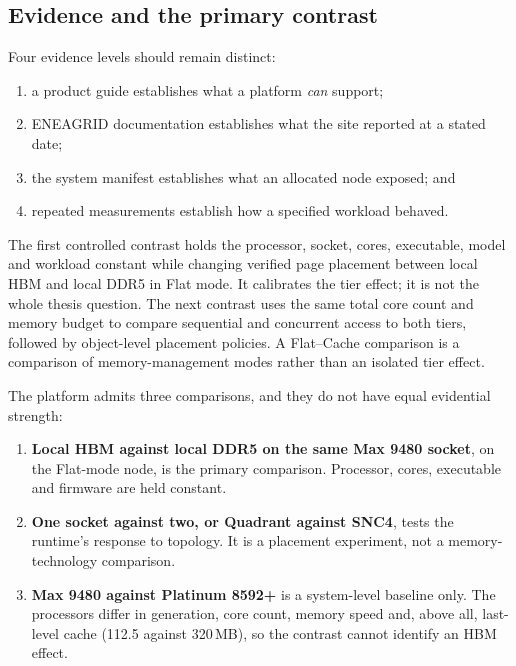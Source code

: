 \subsection{Evidence and the primary contrast}

Four evidence levels should remain distinct:

\begin{enumerate}
  \item a product guide establishes what a platform \emph{can} support;
  \item ENEAGRID documentation establishes what the site reported at a
        stated date;
  \item the system manifest establishes what an allocated node exposed;
        and
  \item repeated measurements establish how a specified workload
        behaved.
\end{enumerate}

The first controlled contrast holds the processor, socket, cores,
executable, model and workload constant while changing verified page
placement between local HBM and local DDR5 in Flat mode.  It calibrates
the tier effect; it is not the whole thesis question.  The next contrast
uses the same total core count and memory budget to compare sequential
and concurrent access to both tiers, followed by object-level placement
policies.  A Flat--Cache comparison is a comparison of
memory-management modes rather than an isolated tier effect.

The platform admits three comparisons, and they do not have equal
evidential strength:

\begin{enumerate}
  \item \textbf{Local HBM against local DDR5 on the same Max 9480
        socket}, on the Flat-mode node, is the primary comparison.
        Processor, cores, executable and firmware are held constant.
  \item \textbf{One socket against two, or Quadrant against SNC4}, tests
        the runtime's response to topology.  It is a placement
        experiment, not a memory-technology comparison.
  \item \textbf{Max 9480 against Platinum 8592+} is a system-level
        baseline only.  The processors differ in generation, core count,
        memory speed and, above all, last-level cache (112.5 against
        320\,MB), so the contrast cannot identify an HBM effect.
\end{enumerate}


